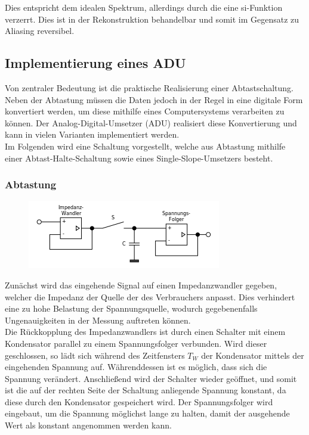 Dies entspricht dem idealen Spektrum, allerdings durch die eine si-Funktion verzerrt. Dies ist in der Rekonstruktion behandelbar und somit im Gegensatz zu Aliasing reversibel.\\

\subsection{Implementierung eines ADU}
\label{3.3}
Von zentraler Bedeutung ist die praktische Realisierung einer Abtastschaltung. Neben der Abtastung müssen die Daten jedoch in der Regel in eine digitale Form konvertiert werden, um diese mithilfe eines Computersystems verarbeiten zu können. Der Analog-Digital-Umsetzer (ADU) realisiert diese Konvertierung und kann in vielen Varianten implementiert werden.\\
Im Folgenden wird eine Schaltung vorgestellt, welche aus Abtastung mithilfe einer Abtast-Halte-Schaltung sowie eines Single-Slope-Umsetzers besteht.
\subsubsection{Abtastung}
\label{3.3.1}

\begin{figure}[h!]
\centering
\includegraphics[scale=0.8]{images/abtastung_schaltung.png}
\label{sah_schaltung}
\end{figure}

Zunächst wird das eingehende Signal auf einen Impedanzwandler gegeben, welcher die Impedanz der Quelle der des Verbrauchers anpasst. Dies verhindert eine zu hohe Belastung der Spannungsquelle, wodurch gegebenenfalls Ungenauigkeiten in der Messung auftreten können.\\
Die Rückkopplung des Impedanzwandlers ist durch einen Schalter mit einem Kondensator parallel zu einem Spannungsfolger verbunden. Wird dieser geschlossen, so lädt sich während des Zeitfensters $T_W$ der Kondensator mittels der eingehenden Spannung auf. Währenddessen ist es möglich, dass sich die Spannung verändert. Anschließend wird der Schalter wieder geöffnet, und somit ist die auf der rechten Seite der Schaltung anliegende Spannung konstant, da diese durch den Kondensator gespeichert wird. Der Spannungsfolger wird eingebaut, um die Spannung möglichst lange zu halten, damit der ausgehende Wert als konstant angenommen werden kann.\\

